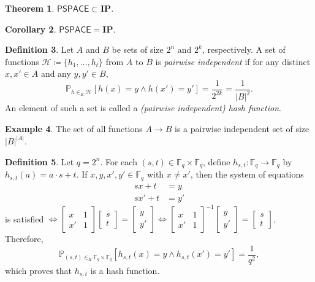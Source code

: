 \documentclass[10pt,letterpaper,cm]{nupset}
\theoremstyle{definition}
\newtheorem{definition}{Definition}[subsection]
\newtheorem{exmp}[definition]{Example}
\theoremstyle{theorem}
\newtheorem{theorem}[definition]{Theorem}
\newtheorem{corollary}[definition]{Corollary}
\theoremstyle{remark}
\newcommand{\F}{\mathbb F}
\renewcommand{\H}{\mathcal H}
\newcommand{\1}{\mathbf{1}}
\newcommand{\0}{\vec 0}
\begin{document}
\begin{theorem}
$\mathsf{PSPACE} \subset \mathbf{IP}$.
\end{theorem}

\begin{corollary}
$\mathsf{PSPACE} = \mathbf{IP}$.
\end{corollary}

\begin{definition}
Let $A$ and $B$ be sets of size $2^n$ and $2^k$, respectively. A set of functions $\H\coloneqq \{h_1, \ldots, h_t\}$ from $A$ to $B$ is \textit{pairwise independent} if for any distinct $x, x' \in A$ and any $y, y' \in B$, $$  \mathbb{P}_{h \in_R \H}[h(x) = y \land h(x') = y'] = \frac{1}{2^{2k}}  = \frac{1}{|B|^2}.$$ An element of such a set is called a \textit{(pairwise independent) hash function}.
\end{definition}

\begin{exmp}
The set of all functions $A \to B$ is a pairwise independent set of size $|B|^{|A|}$. 
\end{exmp}

\begin{definition}
Let $q= 2^n$. For each $(s,t) \in \F_q \times \F_q$, define $h_{s,t} : \F_q \to \F_q$ by $h_{s,t}(a) = a \cdot s +t$. If $x,y, x', y' \in \F_q$ with $x \ne x'$, then the system of equations \begin{align*} 
sx + t & = y \\ sx' +t & = y'
\end{align*} 
is satisfied $\iff  \begin{bmatrix}  x & 1 \\ x' & 1   \end{bmatrix} \begin{bmatrix} s \\ t    \end{bmatrix} = \begin{bmatrix} y \\ y' \end{bmatrix} \iff  \begin{bmatrix}  x & 1 \\ x' & 1   \end{bmatrix}^{-1} \begin{bmatrix} y \\ y' \end{bmatrix}  = \begin{bmatrix} s \\ t    \end{bmatrix} $. Therefore, $$\mathbb{P}_{(s,t)\in_R \F_q\times \F_q}[h_{s,t}(x) = y \land h_{s,t}(x') = y'] = \frac{1}{q^2},$$ which proves that $h_{s,t}$ is a hash function.
\end{definition}
\end{document}
